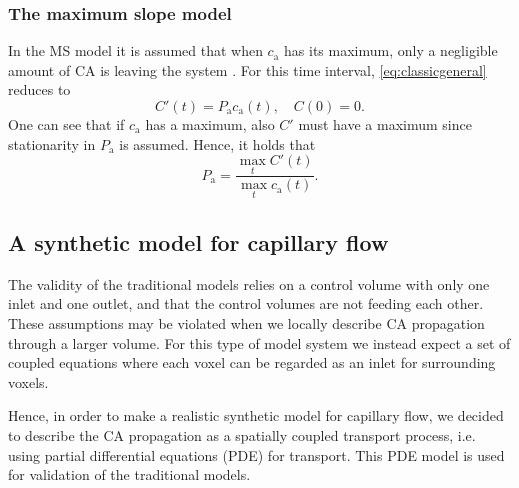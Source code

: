 \documentclass[final,5p,times,twocolumn]{elsarticle}
\begin{document}
	\subsubsection{The maximum slope model}\label{sec:ms}	
	In the MS model it is assumed that when $c_\mathrm{a}$ has its maximum, only a negligible amount of CA is leaving the system \cite{klotz99}.
	For this time interval, \eqref{eq:classicgeneral} reduces to 
	\begin{equation}
		C'(t) = P_{\mathrm{a}}c_\mathrm{a}(t), \quad C(0) = 0.
	\end{equation}
	One can see that if $c_\mathrm{a}$ has a maximum, also $C'$ must have a maximum since stationarity in $P_{\mathrm{a}}$ is assumed.
	Hence, it holds that
	\begin{equation}\label{eq:MS}
		P_{\mathrm{a}} = \frac{\max_{t}C'(t)}{\max_{t}c_\mathrm{a}(t)}.
	\end{equation}

	
	
	\subsection{A synthetic model for capillary flow}\label{sec:synthetic}

	The validity of the traditional models relies on a control volume with only one inlet and one outlet, and that the control volumes are not feeding each other.
	These assumptions may be violated when we locally describe CA propagation through a larger volume.
	For this type of model system we instead expect a set of coupled equations where each voxel can be regarded as an inlet for surrounding voxels.

	Hence, in order to make a realistic synthetic model for capillary flow, we decided to describe the CA propagation as a spatially coupled transport process, i.e. using partial differential equations (PDE) for transport. This PDE model is used for validation of the traditional models. 
\end{document}

